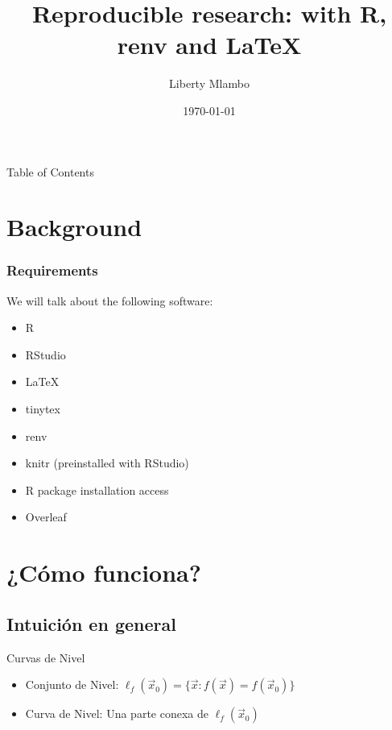 \documentclass[fleqn]{beamer}\usepackage[]{graphicx}\usepackage[]{color}
\title{Reproducible research: with R, renv and \LaTeX}
\author{Liberty Mlambo}
\institute[SB Stats Group]{ Research Assistant:\\ University of Nottingham}
\date{\today}
\begin{document}
\begin{frame}
  \titlepage
\end{frame}

\begin{frame}{Table of Contents}
    \tableofcontents
\end{frame}

\section{Background}
\begin{frame}
  \frametitle{Requirements}
    We will talk about the following software:
    \begin{itemize}[<+->]
      \item R 
      \item RStudio
      \item \LaTeX
      \item tinytex
      \item renv
      \item knitr (preinstalled with RStudio)
      \item R package installation access
      \item Overleaf
    \end{itemize}
\end{frame}

\section{¿Cómo funciona?}
\subsection{Intuición en general}
\begin{frame}{Curvas de Nivel}
    \begin{itemize}
        \item Conjunto de Nivel: $\ell_{f}(\vec{x}_0)= \{\vec{x}: f(\vec{x}) = f(\vec{x}_0) \}$
        \item Curva de Nivel: Una parte conexa de $\ell_f(\vec{x}_0)$
    \end{itemize}
\end{frame}
\end{document}
